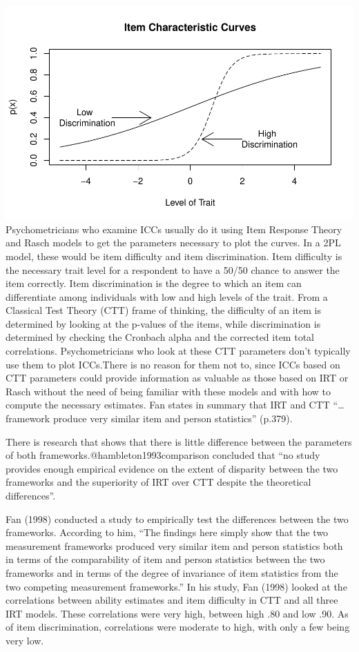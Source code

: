 \documentclass[
  english,
  man,floatsintext]{apa6}
\begin{document}
\includegraphics{ICC_project_files/figure-latex/unnamed-chunk-1-1.pdf}
\newpage
Psychometricians who examine ICCs usually do it using Item Response Theory and Rasch models to get the parameters necessary to plot the curves. In a 2PL model, these would be item difficulty and item discrimination. Item difficulty is the necessary trait level for a respondent to have a 50/50 chance to answer the item correctly. Item discrimination is the degree to which an item can differentiate among individuals with low and high levels of the trait. From a Classical Test Theory (CTT) frame of thinking, the difficulty of an item is determined by looking at the p-values of the items, while discrimination is determined by checking the Cronbach alpha and the corrected item total correlations. Psychometricians who look at these CTT parameters don't typically use them to plot ICCs.There is no reason for them not to, since ICCs based on CTT parameters could provide information as valuable as those based on IRT or Rasch without the need of being familiar with these models and with how to compute the necessary estimates. Fan states in summary that IRT and CTT \enquote{\ldots{} framework produce very similar item and person statistics} (p.379).

There is research that shows that there is little difference between the parameters of both frameworks.@hambleton1993comparison concluded that \enquote{no study provides enough empirical evidence on the extent of disparity between the two frameworks and the superiority of IRT over CTT despite the theoretical differences}.

Fan (1998) conducted a study to empirically test the differences between the two frameworks. According to him, \enquote{The findings here simply show that the two measurement frameworks produced very similar item and person statistics both in terms of the comparability of item and person statistics between the two frameworks and in terms of the degree of invariance of item statistics from the two competing measurement frameworks.} In his study, Fan (1998) looked at the correlations between ability estimates and item difficulty in CTT and all three IRT models. These correlations were very high, between high .80 and low .90. As of item discrimination, correlations were moderate to high, with only a few being very low.
\end{document}
